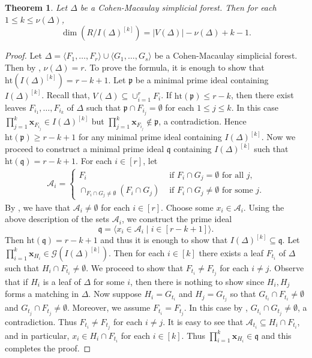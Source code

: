 \documentclass[12pt,a4paper,reqno]{amsart}
\newtheorem{theorem}[proposition]{Theorem}
\theoremstyle{definition}
\def\G{\mathcal{G}}
\def\p{\mathfrak{p}}
\def\q{\mathfrak{q}}
\def\D{\Delta}
\def\h{\mathrm{ht}}
\def\l{\langle}
\def\r{\rangle}
\def\x{\mathbf x}
\begin{document}
\begin{theorem}\label{dimension lemma}
    Let $\Delta$ be a Cohen-Macaulay simplicial forest. Then for each $1\le k\le \nu(\Delta)$,
    \[
    \dim(R/I(\Delta)^{[k]})=|V(\Delta)|-\nu(\D)+k-1.
    \]
\end{theorem}
\begin{proof} Let $\D=\l F_1,\ldots,F_r\r\cup\l G_1,\ldots,G_s\r$ be a Cohen-Macaulay simplicial forest. Then by , $\nu(\D)=r$. To prove the formula, it is enough to show that $\h(I(\Delta)^{[k]})=r-k+1$. Let $\p$ be a minimal prime ideal containing $I(\Delta)^{[k]}$. Recall that, $V(\D)\subseteq\cup_{i=1}^r F_i$. If $\h(\p)\le r-k$, then there exist leaves $F_{i_1},\ldots,F_{i_k}$ of $\Delta$ such that $\p\cap F_{i_j}=\emptyset$ for each $1\le j\le k$. In this case $\prod_{j=1}^k\x_{F_{i_j}}\in I(\Delta)^{[k]}$ but $\prod_{j=1}^k\x_{F_{i_j}}\notin\p$, a contradiction. Hence $\h(\p)\ge r-k+1$ for any minimal prime ideal containing $I(\Delta)^{[k]}$. Now we proceed to construct a minimal prime ideal $\q$ containing $I(\Delta)^{[k]}$ such that $\h(\q)=r-k+1$. For each $i\in[r]$, let
    \begin{align*}
        \mathcal{A}_i=\begin{cases}
            F_i&\text{ if }F_i\cap G_j=\emptyset\text{ for all }j,\\
            \cap_{F_i\cap G_j\neq\emptyset}(F_i\cap G_j)&\text{ if }F_i\cap G_j\neq\emptyset\text{ for some }j.
        \end{cases}
    \end{align*}
    By , we have that $\mathcal A_i\neq\emptyset$ for each $i\in [r]$. Choose some $x_i\in\mathcal A_i$. Using the above description of the sets $\mathcal{A}_i$, we construct the prime ideal 
    \[
    \q=\l x_i\in \mathcal A_i\mid i\in [r-k+1]\r.
    \]
    Then $\h(\q)=r-k+1$ and thus it is enough to show that $I(\Delta)^{[k]}\subseteq \q$. Let $\prod_{i=1}^k\x_{H_i}\in\G(I(\Delta)^{[k]})$. Then for each $i\in[k]$ there exists a leaf $F_{t_i}$ of $\Delta$ such that $H_i\cap F_{t_i}\neq \emptyset$. We proceed to show that $F_{t_i}\neq F_{t_j}$ for each $i\neq j$. Observe that if $H_i$ is a leaf of $\Delta$ for some $i$, then there is nothing to show since $H_i,H_j$ forms a matching in $\Delta$. Now suppose $H_i=G_{t_i}$ and $H_j=G_{t_j}$ so that $G_{t_i}\cap F_{t_i}\neq\emptyset$ and $G_{t_j}\cap F_{t_j}\neq\emptyset$. Moreover, we assume $F_{t_i}=F_{t_j}$. In this case by , $G_{t_i}\cap G_{t_j}\neq\emptyset$, a contradiction. Thus $F_{t_i}\neq F_{t_j}$ for each $i\neq j$. It is easy to see that $\mathcal A_{t_i}\subseteq H_i\cap F_{t_i}$, and in particular, $x_i\in H_i\cap F_{t_i}$ for each $i\in [k]$. Thus $\prod_{i=1}^k\x_{H_i}\in \q$ and this completes the proof.
\end{proof}
\end{document}
